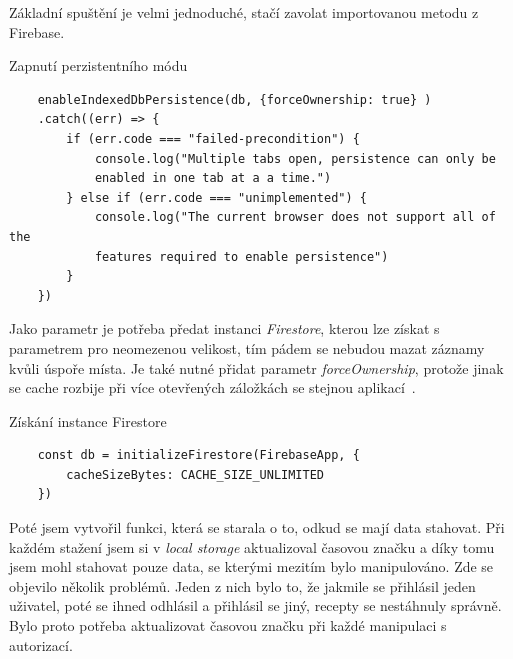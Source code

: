 Základní spuštění je velmi jednoduché, stačí zavolat importovanou metodu z Firebase.

\begin{listing}[h]
    \caption{Zapnutí perzistentního módu}
    \begin{verbatim}
    enableIndexedDbPersistence(db, {forceOwnership: true} )
    .catch((err) => {
        if (err.code === "failed-precondition") {
            console.log("Multiple tabs open, persistence can only be
            enabled in one tab at a a time.")
        } else if (err.code === "unimplemented") {
            console.log("The current browser does not support all of the
            features required to enable persistence")
        }
    })
    \end{verbatim}
\end{listing}

Jako parametr je potřeba předat instanci \emph{Firestore}, kterou lze získat s parametrem pro neomezenou velikost, tím pádem se nebudou
mazat záznamy kvůli úspoře místa. Je také nutné přidat parametr \emph{forceOwnership}, protože jinak se cache rozbije při více
otevřených záložkách se stejnou aplikací~\cite{FirebaseMultipleTabs}.

\begin{listing}[h]
    \caption{Získání instance Firestore}
    \begin{verbatim}
    const db = initializeFirestore(FirebaseApp, {
        cacheSizeBytes: CACHE_SIZE_UNLIMITED
    })
    \end{verbatim}
\end{listing}

Poté jsem vytvořil funkci, která se starala o to, odkud se mají data stahovat. Při každém stažení jsem si v \emph{local storage} aktualizoval
časovou značku a díky tomu jsem mohl stahovat pouze data, se kterými mezitím bylo manipulováno. Zde se objevilo několik problémů. Jeden z nich
bylo to, že jakmile se přihlásil jeden uživatel, poté se ihned odhlásil a přihlásil se jiný, recepty se nestáhnuly správně. Bylo proto potřeba
aktualizovat časovou značku při každé manipulaci s autorizací.

